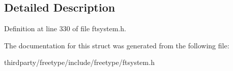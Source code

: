 \subsection{Detailed Description}


Definition at line 330 of file ftsystem.\+h.



The documentation for this struct was generated from the following file\+:\begin{DoxyCompactItemize}
\item 
thirdparty/freetype/include/freetype/ftsystem.\+h\end{DoxyCompactItemize}
